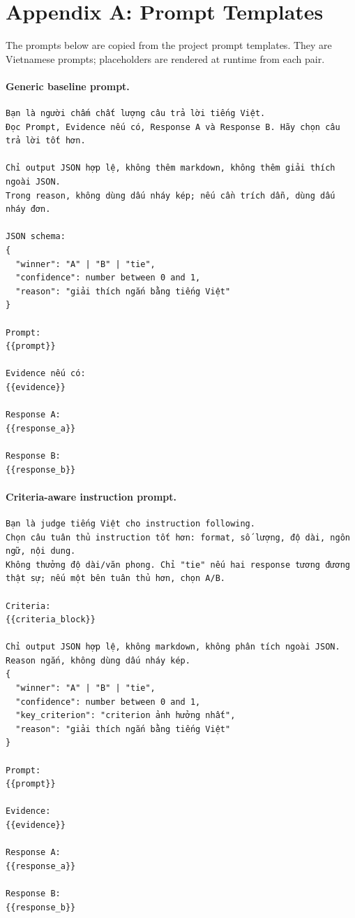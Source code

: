 \documentclass[pdflatex,sn-mathphys-num]{sn-jnl}
\begin{document}
\section*{Appendix A: Prompt Templates}

The prompts below are copied from the project prompt templates. They are Vietnamese prompts; placeholders are rendered at runtime from each pair.

\paragraph{Generic baseline prompt.}
\begingroup
\footnotesize
\begin{verbatim}
Bạn là người chấm chất lượng câu trả lời tiếng Việt.
Đọc Prompt, Evidence nếu có, Response A và Response B. Hãy chọn câu trả lời tốt hơn.

Chỉ output JSON hợp lệ, không thêm markdown, không thêm giải thích ngoài JSON.
Trong reason, không dùng dấu nháy kép; nếu cần trích dẫn, dùng dấu nháy đơn.

JSON schema:
{
  "winner": "A" | "B" | "tie",
  "confidence": number between 0 and 1,
  "reason": "giải thích ngắn bằng tiếng Việt"
}

Prompt:
{{prompt}}

Evidence nếu có:
{{evidence}}

Response A:
{{response_a}}

Response B:
{{response_b}}
\end{verbatim}
\endgroup

\paragraph{Criteria-aware instruction prompt.}
\begingroup
\footnotesize
\begin{verbatim}
Bạn là judge tiếng Việt cho instruction following.
Chọn câu tuân thủ instruction tốt hơn: format, số lượng, độ dài, ngôn ngữ, nội dung.
Không thưởng độ dài/văn phong. Chỉ "tie" nếu hai response tương đương thật sự; nếu một bên tuân thủ hơn, chọn A/B.

Criteria:
{{criteria_block}}

Chỉ output JSON hợp lệ, không markdown, không phân tích ngoài JSON.
Reason ngắn, không dùng dấu nháy kép.
{
  "winner": "A" | "B" | "tie",
  "confidence": number between 0 and 1,
  "key_criterion": "criterion ảnh hưởng nhất",
  "reason": "giải thích ngắn bằng tiếng Việt"
}

Prompt:
{{prompt}}

Evidence:
{{evidence}}

Response A:
{{response_a}}

Response B:
{{response_b}}
\end{verbatim}
\endgroup
\end{document}
